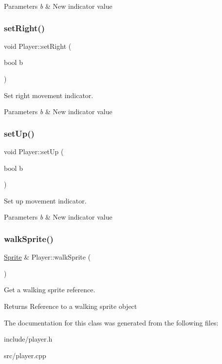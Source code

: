 \begin{DoxyParams}{Parameters}
{\em b} & New indicator value \\
\hline
\end{DoxyParams}
\mbox{\label{class_player_ae6f8aeb9f247fa3cd5204a61ee491285}} 
\subsubsection{\texorpdfstring{set\+Right()}{setRight()}}
{\footnotesize\ttfamily void Player\+::set\+Right (\begin{DoxyParamCaption}\item[{bool}]{b }\end{DoxyParamCaption})}



Set right movement indicator. 


\begin{DoxyParams}{Parameters}
{\em b} & New indicator value \\
\hline
\end{DoxyParams}
\mbox{\label{class_player_a2a910876c4833690e05e50acfd2333a4}} 
\subsubsection{\texorpdfstring{set\+Up()}{setUp()}}
{\footnotesize\ttfamily void Player\+::set\+Up (\begin{DoxyParamCaption}\item[{bool}]{b }\end{DoxyParamCaption})}



Set up movement indicator. 


\begin{DoxyParams}{Parameters}
{\em b} & New indicator value \\
\hline
\end{DoxyParams}
\mbox{\label{class_player_a03facc6ecd237a274e74516cca4b173d}} 
\subsubsection{\texorpdfstring{walk\+Sprite()}{walkSprite()}}
{\footnotesize\ttfamily \hyperlink{class_sprite}{Sprite} \& Player\+::walk\+Sprite (\begin{DoxyParamCaption}{ }\end{DoxyParamCaption})}



Get a walking sprite reference. 

\begin{DoxyReturn}{Returns}
Reference to a walking sprite object 
\end{DoxyReturn}


The documentation for this class was generated from the following files\+:\begin{DoxyCompactItemize}
\item 
include/player.\+h\item 
src/player.\+cpp\end{DoxyCompactItemize}
